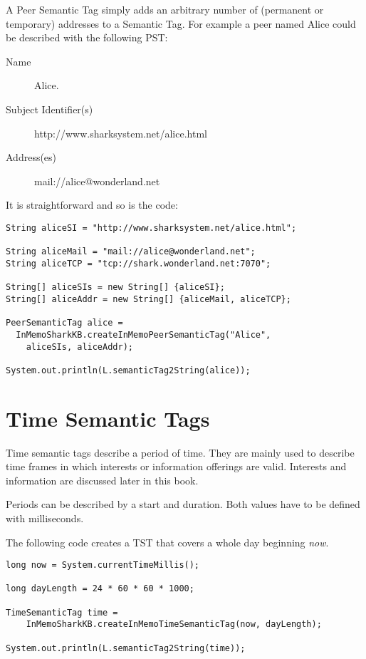 A Peer Semantic Tag simply adds an arbitrary number of (permanent or temporary) addresses to a Semantic Tag. For example a peer named Alice could be described with the following PST: 

\begin{description}
    \item[Name] Alice.
    \item[Subject Identifier(s)] http://www.sharksystem.net/alice.html
    \item[Address(es)] mail://alice@wonderland.net
\end{description}

It is straightforward and so is the code:

\begin{verbatim}
String aliceSI = "http://www.sharksystem.net/alice.html";

String aliceMail = "mail://alice@wonderland.net";
String aliceTCP = "tcp://shark.wonderland.net:7070";

String[] aliceSIs = new String[] {aliceSI};
String[] aliceAddr = new String[] {aliceMail, aliceTCP};

PeerSemanticTag alice = 
  InMemoSharkKB.createInMemoPeerSemanticTag("Alice", 
    aliceSIs, aliceAddr);

System.out.println(L.semanticTag2String(alice));
\end{verbatim}

\section{Time Semantic Tags}
Time semantic tags describe a period of time. They are mainly used to describe time frames in which interests or information offerings are valid. Interests and information are discussed later in this book.

Periods can be described by a start and duration. Both values have to be defined with milliseconds.

The following code creates a TST that covers a whole day beginning {\it now}.

\begin{verbatim}
long now = System.currentTimeMillis();

long dayLength = 24 * 60 * 60 * 1000; 

TimeSemanticTag time = 
    InMemoSharkKB.createInMemoTimeSemanticTag(now, dayLength);

System.out.println(L.semanticTag2String(time));
\end{verbatim}

